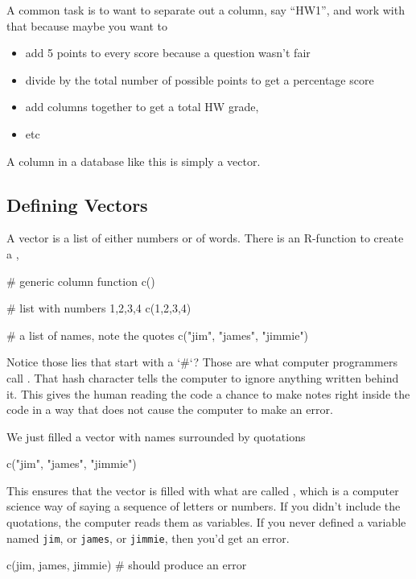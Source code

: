 A common task is to want to separate out a column, say ``HW1'', and
work with that because maybe you want to
\begin{itemize}
\item add 5 points to every score because a question wasn't fair
\item divide by the total number of possible points to get a percentage score
\item add columns together to get a total HW grade,
\item etc
\end{itemize}

A column in a database like this is simply a vector.
  
\subsection{Defining Vectors}

A vector is a list of either numbers or of words. There is an
R-function to create a ,

\begin{rcode}
# generic column function
c()

# list with numbers 1,2,3,4
c(1,2,3,4)

# a list of names, note the quotes
c("jim", "james", "jimmie") 
\end{rcode}

Notice those lies that start with a `\#`?  Those are what computer programmers call .  That hash character tells the computer to ignore anything written behind it. This gives the human reading the code a chance to make notes right inside the code in a way that does not cause the computer to make an error.

We just filled a vector with names surrounded by quotations

\begin{rcode}
  c("jim", "james", "jimmie")
\end{rcode}

This ensures that the vector is filled with what are called
, which is a computer science way of saying a sequence
of letters or numbers. If you didn't include the quotations, the
computer reads them as variables. If you never defined a variable
named \texttt{jim}, or \texttt{james}, or \texttt{jimmie}, then you'd
get an error.

\begin{rcode}
  c(jim, james, jimmie) # should produce an error
\end{rcode}

